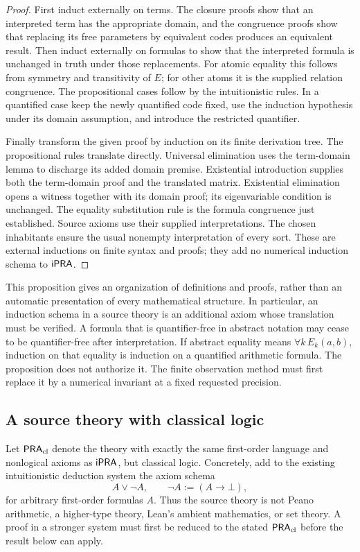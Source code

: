 \begin{proof}
First induct externally on terms. The closure proofs show that an interpreted
term has the appropriate domain, and the congruence proofs show that replacing
its free parameters by equivalent codes produces an equivalent result.
Then induct externally on formulas to show that the interpreted formula is
unchanged in truth under those replacements. For atomic equality this follows
from symmetry and transitivity of \(E\); for other atoms it is the supplied
relation congruence. The propositional cases follow by the intuitionistic
rules. In a quantified case keep the newly quantified code fixed, use the
induction hypothesis under its domain assumption, and introduce the
restricted quantifier.

Finally transform the given proof by induction on its finite derivation
tree. The propositional rules translate directly. Universal elimination
uses the term-domain lemma to discharge its added domain premise.
Existential introduction supplies both the term-domain proof and the
translated matrix. Existential elimination opens a witness together with
its domain proof; its eigenvariable condition is unchanged. The equality
substitution rule is the formula congruence just established. Source axioms
use their supplied interpretations. The chosen inhabitants ensure the usual
nonempty interpretation of every sort. These are external inductions on
finite syntax and proofs; they add no numerical induction schema to
\(\mathsf{iPRA}\).
\end{proof}

This proposition gives an organization of definitions and proofs, rather
than an automatic presentation of every mathematical structure. In
particular, an induction schema in a source theory is an additional axiom
whose translation must be verified. A formula that is quantifier-free in
abstract notation may cease to be quantifier-free after interpretation.
If abstract equality means \(\forall k\,E_k(a,b)\), induction on that
equality is induction on a quantified arithmetic formula. The proposition
does not authorize it. The finite observation method must first replace it
by a numerical invariant at a fixed requested precision.

\subsection{A source theory with classical logic}

Let \(\mathsf{PRA}_{\mathrm{cl}}\) denote the theory with exactly the same first-order language
and nonlogical axioms as \(\mathsf{iPRA}\), but classical logic. Concretely, add to
the existing intuitionistic deduction system the axiom schema
\[
 A\lor\neg A,
 \qquad \neg A:=(A\to\bot),
\]
for arbitrary first-order formulas \(A\). Thus the source theory is not
Peano arithmetic, a higher-type theory, Lean's ambient mathematics, or set
theory. A proof in a stronger system must first be reduced to the stated
\(\mathsf{PRA}_{\mathrm{cl}}\) before the result below can apply.

